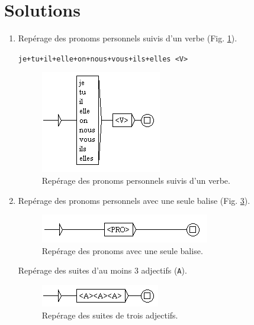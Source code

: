 \documentclass[xcolor={table,usenames,dvipsnames}]{article}
\begin{document}
\section{Solutions}

\begin{enumerate}
	\item 
	Repérage des pronoms personnels suivis d'un verbe (Fig. \ref{fig:jetuil}).
	
	\texttt{je+tu+il+elle+on+nous+vous+ils+elles <V>}
	
			\begin{figure}[H] %
		\centering
		\includegraphics[width=.3\linewidth]{img/jetuil.png}
		\caption{Repérage des pronoms personnels suivis d'un verbe.}
		\label{fig:jetuil}
	\end{figure}
	
	\item Repérage des pronoms personnels avec une seule balise (Fig. \ref{fig:jetuil_balise}).
		\begin{figure}[H] %
		\centering
		\includegraphics[width=1\linewidth]{img/pronom.png}
		\caption{Repérage des pronoms avec une seule balise.}
		\label{fig:jetuil_balise}
	\end{figure}
	
	Repérage des suites d'au moins 3 adjectifs (\texttt{A}).
			\begin{figure}[H] %
		\centering
		\includegraphics[width=.7\linewidth]{img/adjectifs.png}
		\caption{Repérage des suites de trois adjectifs.}
		\label{fig:jetuil_balise}
	\end{figure}
	

\end{enumerate}
\end{document}
